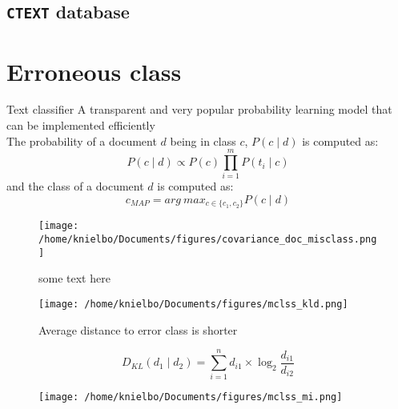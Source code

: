 \subsection{\texttt{CTEXT} database}

\section{Erroneous class}

\begin{frame}{Text classifier}
A transparent and very popular probability learning model that can be implemented efficiently\\
\medskip
The probability of a document $d$ being in class $c$, $P(c \mid d)$ is computed as:
\begin{equation*}
P(c \mid d) \propto P(c) \prod_{i = 1}^{m}P(t_i \mid c) 
\end{equation*}
and the class of a document $d$ is computed as:\\

\begin{equation*}
c_{MAP} = arg~max_{c \in \{c_1, c_2 \}} P(c \mid d)
\end{equation*}

\end{frame}

\begin{frame}
	\begin{figure}
		\centering
		\texttt{[image: /home/knielbo/Documents/figures/covariance\_doc\_misclass.png]}
		\caption{some text here}
	\end{figure}
\end{frame}


\begin{frame}
\begin{figure}
	\centering
	\texttt{[image: /home/knielbo/Documents/figures/mclss\_kld.png]}
	\caption{Average distance to error class is shorter}
\end{figure}
\begin{equation}
D_{KL}(d_1 \mid d_2)  = \sum_{i = 1}^{n} d_{i1} \times \log_2 \frac{d_{i1}}{d_{i2}}
\end{equation}
\end{frame}


\begin{frame}
\begin{figure}
	\centering
	\texttt{[image: /home/knielbo/Documents/figures/mclss\_mi.png]}
	\caption{}
\end{figure}
\end{frame}


